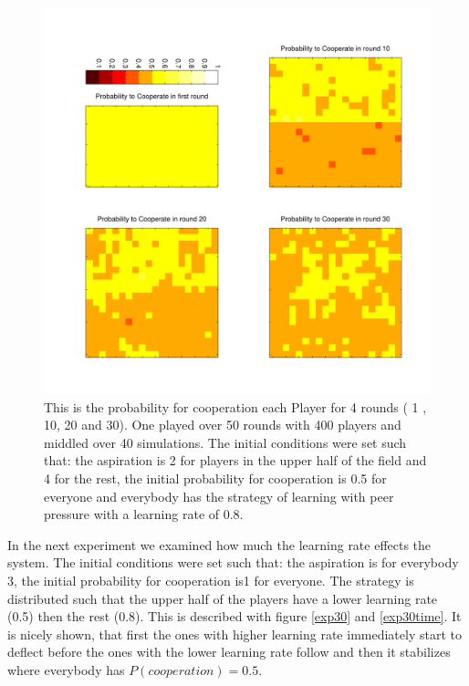 \documentclass[11pt]{article}
\begin{document}
\begin{figure}
\centering
\includegraphics[scale=0.6]{ProbabilityToCooperateInDiffRound12.pdf}
\caption[]{This is the probability for cooperation each Player for 4 rounds ( 1 , 10, 20 and 30). One played over 50 rounds with 400 players and middled over 40 simulations. The initial conditions were set such that: the aspiration is 2 for players in the upper half of the field and 4 for the rest, the initial probability for cooperation is 0.5 for everyone and everybody has the strategy of learning with peer pressure with a learning rate of 0.8. }
\label{exp12}
\end{figure}
In the next experiment we examined how much the learning rate effects the system.  The initial conditions were set such that: the aspiration is for everybody 3, the initial probability for cooperation is1 for everyone. The strategy is distributed such that the upper half of the players have a lower learning rate (0.5) then the rest (0.8). This is described with figure \ref{exp30} and \ref{exp30time}. It is nicely shown, that first the ones with higher learning rate immediately start to deflect before the ones with the lower learning rate follow and then it stabilizes where everybody has $P(cooperation)=0.5$. 
\end{document}
